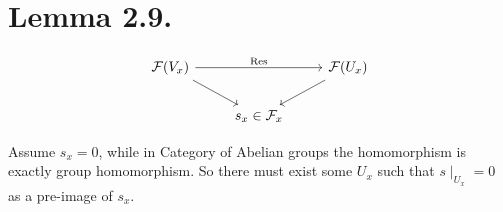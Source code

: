 \section{Lemma 2.9.}

\[\begin{tikzcd}
	{\mathcal F(V_x)} && {\mathcal F(U_x)} \\
	& {s_x\in\mathcal F_x}
	\arrow["{\text{Res}}", from=1-1, to=1-3]
	\arrow[from=1-1, to=2-2]
	\arrow[from=1-3, to=2-2]
\end{tikzcd}\]

Assume $s_x=0$, while in Category of Abelian groups the homomorphism is exactly group homomorphism. So there must exist some $U_x$ such that $s\mid_{U_x}=0$ as a pre-image of $s_x$.